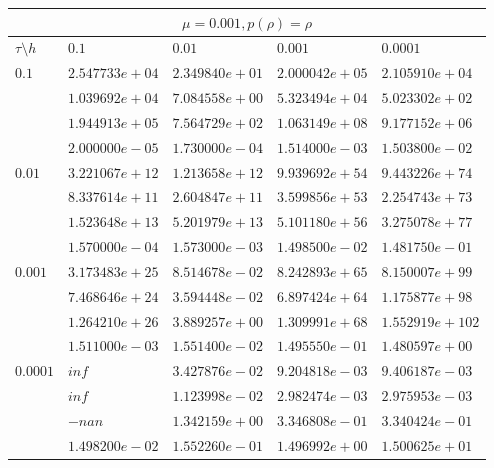 \documentclass[12pt,a4paper]{article}
\begin{document}
\begin{tabular}{ |l|l|l|l|l| }
    \hline
    \multicolumn{5}{|c|}{$\mu = 0.001, p(\rho)  = \rho$}\\
    \hline
    $\tau\setminus h$ & $0.1$ & $0.01$ & $0.001$ & $0.0001$\\
    \hline
    $0.1$ & $2.547733e+04$ & $2.349840e+01$ & $2.000042e+05$ & $2.105910e+04$ \\
    & $1.039692e+04$ & $7.084558e+00$ & $5.323494e+04$ & $5.023302e+02$ \\
    & $1.944913e+05$ & $7.564729e+02$ & $1.063149e+08$ & $9.177152e+06$ \\
    & $2.000000e-05$ & $1.730000e-04$ & $1.514000e-03$ & $1.503800e-02$ \\
    \hline
    $0.01$ & $3.221067e+12$ & $1.213658e+12$ & $9.939692e+54$ & $9.443226e+74$ \\
    & $8.337614e+11$ & $2.604847e+11$ & $3.599856e+53$ & $2.254743e+73$ \\
    & $1.523648e+13$ & $5.201979e+13$ & $5.101180e+56$ & $3.275078e+77$ \\
    & $1.570000e-04$ & $1.573000e-03$ & $1.498500e-02$ & $1.481750e-01$ \\
    \hline
    $0.001$ & $3.173483e+25$ & $8.514678e-02$ & $8.242893e+65$ & $8.150007e+99$ \\
    & $7.468646e+24$ & $3.594448e-02$ & $6.897424e+64$ & $1.175877e+98$ \\
    & $1.264210e+26$ & $3.889257e+00$ & $1.309991e+68$ & $1.552919e+102$ \\
    & $1.511000e-03$ & $1.551400e-02$ & $1.495550e-01$ & $1.480597e+00$ \\
    \hline
    $0.0001$ & $inf$ & $3.427876e-02$ & $9.204818e-03$ & $9.406187e-03$ \\
    & $inf$ & $1.123998e-02$ & $2.982474e-03$ & $2.975953e-03$ \\
    & $-nan$ & $1.342159e+00$ & $3.346808e-01$ & $3.340424e-01$ \\
    & $1.498200e-02$ & $1.552260e-01$ & $1.496992e+00$ & $1.500625e+01$ \\
    \hline
\end{tabular}
\end{document}
